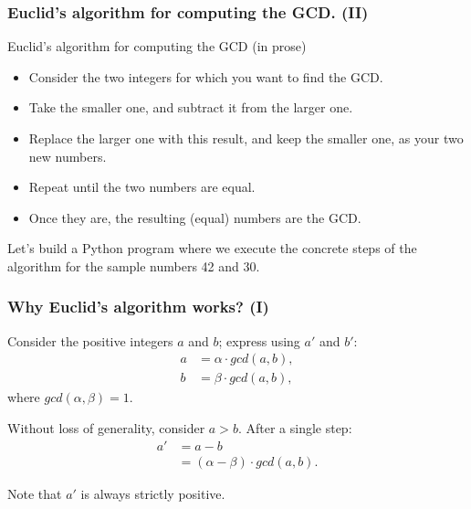 \documentclass{beamer} %
\begin{document}
\begin{frame}
\frametitle{Euclid's algorithm for computing the GCD. (II)} 

\begin{block}{Euclid's algorithm for computing the GCD (in prose)}
\begin{itemize}
\item Consider the two integers for which you want to find the GCD.
\item Take the smaller one, and subtract it from the larger one. 
\item Replace the larger one with this result, and keep the smaller one, as your two new numbers. 
\item Repeat until the two numbers are equal. 
\item Once they are, the resulting (equal) numbers are the GCD.  
\end{itemize}
\end{block}

Let's build a Python program where we execute the concrete steps of the algorithm for the sample numbers 42 and 30.

\end{frame}

\begin{frame}
\frametitle{Why Euclid's algorithm works? (I)}

Consider the positive integers $a$ and $b$; express using $a'$ and $b'$:
\begin{align}
a &= \alpha \cdot gcd(a,b), \\
b &= \beta \cdot gcd(a,b),
\end{align}
where $gcd(\alpha, \beta) = 1.$

Without loss of generality, consider $a > b$. After a single step:
\begin{align}
a' &= a - b \\ 
    &= (\alpha - \beta) \cdot gcd(a,b).
\end{align}

Note that $a'$ is always strictly positive.

\end{frame}
\end{document}
